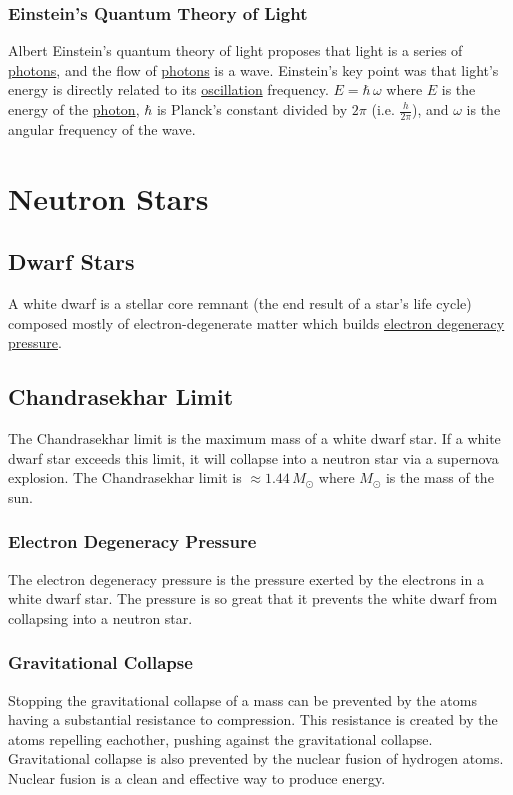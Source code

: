\documentclass{article}
\begin{document}
\subsubsection{Einstein's Quantum Theory of Light}
Albert Einstein's quantum theory of light proposes that light is a series of \hyperref[sec:photons]{photons}, and the flow of \hyperref[sec:photons]{photons} is a wave. Einstein's key point was that light's energy is directly related to its \hyperref[sec:oscillation]{oscillation} frequency. $E = \hbar\,\omega$ where $E$ is the energy of the \hyperref[sec:photons]{photon}, $\hbar$ is Planck's constant divided by $2\pi$ (i.e. $\frac{h}{2\pi}$), and $\omega$ is the angular frequency of the wave.


\section{Neutron Stars}

\subsection{Dwarf Stars}
A white dwarf is a stellar core remnant (the end result of a star's life cycle) composed mostly of electron-degenerate matter which builds \hyperref[sec:electron_degeneracy_pressure]{electron degeneracy pressure}.

\subsection{Chandrasekhar Limit}
The Chandrasekhar limit is the maximum mass of a white dwarf star. If a white dwarf star exceeds this limit, it will collapse into a neutron star via a supernova explosion. The Chandrasekhar limit is $\approx 1.44\,M_{\odot}$ where $M_{\odot}$ is the mass of the sun.

\subsubsection{Electron Degeneracy Pressure}\label{sec:electron_degeneracy_pressure}
The electron degeneracy pressure is the pressure exerted by the electrons in a white dwarf star. The pressure is so great that it prevents the white dwarf from collapsing into a neutron star.

\subsubsection{Gravitational Collapse}
Stopping the gravitational collapse of a mass can be prevented by the atoms having a substantial resistance to compression. This resistance is created by the atoms repelling eachother, pushing against the gravitational collapse. Gravitational collapse is also prevented by the nuclear fusion of hydrogen atoms. Nuclear fusion is a clean and effective way to produce energy.
\end{document}

